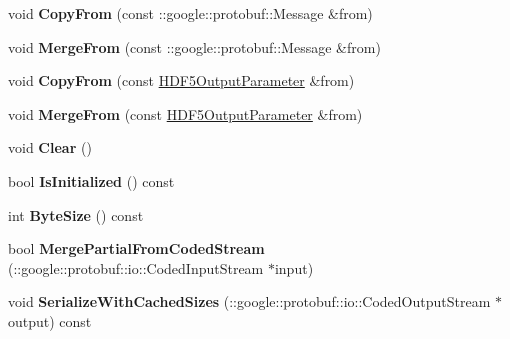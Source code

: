\begin{DoxyCompactItemize}
void {\bfseries Copy\+From} (const \+::google\+::protobuf\+::\+Message \&from)
\item 
\mbox{\label{classcaffe_1_1_h_d_f5_output_parameter_a1e0c07ab77fa846439224b3fca0a46a8}} 
void {\bfseries Merge\+From} (const \+::google\+::protobuf\+::\+Message \&from)
\item 
\mbox{\label{classcaffe_1_1_h_d_f5_output_parameter_a7af9022e2e32467b8baf736470446e15}} 
void {\bfseries Copy\+From} (const \mbox{\hyperlink{classcaffe_1_1_h_d_f5_output_parameter}{H\+D\+F5\+Output\+Parameter}} \&from)
\item 
\mbox{\label{classcaffe_1_1_h_d_f5_output_parameter_a58bb39b6b416af44d76901b721de0487}} 
void {\bfseries Merge\+From} (const \mbox{\hyperlink{classcaffe_1_1_h_d_f5_output_parameter}{H\+D\+F5\+Output\+Parameter}} \&from)
\item 
\mbox{\label{classcaffe_1_1_h_d_f5_output_parameter_a5443f1d939da1e3a7474215f0996bb52}} 
void {\bfseries Clear} ()
\item 
\mbox{\label{classcaffe_1_1_h_d_f5_output_parameter_ac3d59007dfe9fea43bcd7b96463aa0dc}} 
bool {\bfseries Is\+Initialized} () const
\item 
\mbox{\label{classcaffe_1_1_h_d_f5_output_parameter_ad028dfe38b9051f310227ed2332f9ed4}} 
int {\bfseries Byte\+Size} () const
\item 
\mbox{\label{classcaffe_1_1_h_d_f5_output_parameter_ae842a12b8a464cec79cdd9646c8d0cf8}} 
bool {\bfseries Merge\+Partial\+From\+Coded\+Stream} (\+::google\+::protobuf\+::io\+::\+Coded\+Input\+Stream $\ast$input)
\item 
\mbox{\label{classcaffe_1_1_h_d_f5_output_parameter_a84fb51b4a89728d3ecbccbcd21365184}} 
void {\bfseries Serialize\+With\+Cached\+Sizes} (\+::google\+::protobuf\+::io\+::\+Coded\+Output\+Stream $\ast$output) const
\item 
\mbox{\label{classcaffe_1_1_h_d_f5_output_parameter_af93bd67dc537332498539ad187360c08}} 

\end{DoxyCompactItemize}
